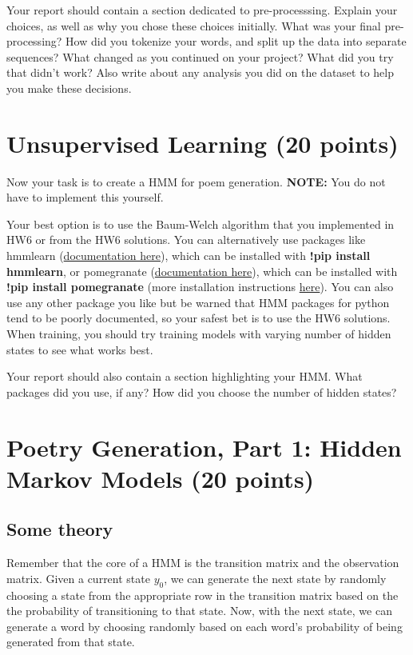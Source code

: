 \begin{report}

    Your report should contain a section dedicated to pre-processsing. Explain your choices, as well as why you chose these choices initially. What was your final pre-processing? How did you tokenize your words, and split up the data into separate sequences? What changed as you continued on your project? What did you try that didn't work? Also write about any analysis you did on the dataset to help you make these decisions.

\end{report}


\section{Unsupervised Learning (20 points)}

Now your task is to create a HMM for poem generation. \textbf{NOTE:} You do not have to implement this yourself.

Your best option is to use the Baum-Welch algorithm that you implemented in HW6 or from the HW6 solutions. You can alternatively use packages like hmmlearn (\href{https://hmmlearn.readthedocs.io/en/latest/}{documentation here}), which can be installed with \textbf{!pip install hmmlearn}, or pomegranate  (\href{https://pomegranate.readthedocs.io/en/latest/HiddenMarkovModel.html}{documentation here}), which can be installed with \textbf{!pip install pomegranate} (more installation instructions \href{https://pomegranate.readthedocs.io/en/latest/install.html}{here}). You can also use any other package you like but be warned that HMM packages for python tend to be poorly documented, so your safest bet is to use the HW6 solutions. When training, you should try training models with varying number of hidden states to see what works best.

\begin{report}

    Your report should also contain a section highlighting your HMM. What packages did you use, if any? How did you choose the number of hidden states? \newline
\end{report}

\section{Poetry Generation, Part 1: Hidden Markov Models (20 points)}
\subsection{Some theory}
Remember that the core of a HMM is the transition matrix and the observation matrix. Given a current state $y_0$, we can generate the next state by randomly choosing a state from the appropriate row in the transition matrix based on the the probability of transitioning to that state. Now, with the next state, we can generate a word by choosing randomly based on each word's probability of being generated from that state.
